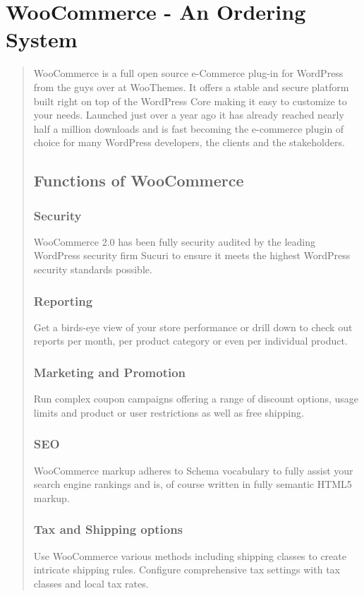 \documentclass[35pt]{report}
\begin{document}
			\section{WooCommerce - An Ordering System}
			\begin{quote}
			WooCommerce is a full open source e-Commerce plug-in for WordPress from the guys over at WooThemes. It offers a stable and secure platform built right on top of the WordPress Core making it easy to customize to your needs. Launched just over a year ago it has already reached nearly half a million downloads and is fast becoming the e-commerce plugin of choice for many WordPress developers, the clients and the stakeholders.

				\subsection{Functions of WooCommerce}
					\subsubsection{Security}
					WooCommerce 2.0 has been fully security audited by the leading WordPress security firm Sucuri to ensure it meets the highest WordPress security standards possible.

					\subsubsection{Reporting}
					Get a birds-eye view of your store performance or drill down to check out reports per month, per product category or even per individual product.

					\subsubsection{Marketing and Promotion}
					Run complex coupon campaigns offering a range of discount options, usage limits and product or user restrictions as well as free shipping.

					\subsubsection{SEO}
					WooCommerce markup adheres to Schema vocabulary to fully assist your search engine rankings and is, of course written in fully semantic HTML5 markup.

					\subsubsection{Tax and Shipping options}
Use WooCommerce various methods including shipping classes to create intricate shipping rules. Configure comprehensive tax settings with tax classes and local tax rates.


\end{quote}
\end{document}
